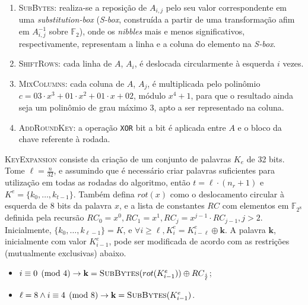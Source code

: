 \documentclass[12pt]{report}
\begin{document}
\begin{enumerate}[label=\roman*.]

    \item \textsc{SubBytes}: realiza-se a reposição de $A_{i,j}$
        pelo seu valor correspondente em uma \emph{substitution-box} (\emph{S-box}, construída a partir de uma transformação afim em $A_{i,j}^{-1}$ sobre $\mathbb{F}_2$), onde os \emph{nibbles} mais e menos significativos, respectivamente, representam a linha e a coluna do elemento na \emph{S-box}.

    \item \textsc{ShiftRows}: cada linha de $A$, $A_i$,
        é deslocada circularmente à esquerda $i$ vezes.

    \item \textsc{MixColumns}: cada coluna de $A$, $A_j$, é multiplicada pelo polinômio
        $c = 03 \cdot x^{3} + 01 \cdot x^{2} + 01 \cdot x + 02$, módulo $x^{4} + 1$, para que o resultado ainda seja um polinômio de grau máximo 3, apto a ser representado na coluna.

    \item \textsc{AddRoundKey}: a operação \texttt{XOR} bit a bit é aplicada entre $A$ e o
        bloco da chave referente à rodada.

\end{enumerate}

\textsc{KeyExpansion} consiste da criação de um conjunto de palavras $K_e$ de 32 bits.
Tome $\ell = \frac{n}{32}$, e assumindo que é necessário criar palavras suficientes para utilização em todas as rodadas do algoritmo, então $t = \ell \cdot (n_r + 1)$ e $K^e = \{k_0, \dots, k_{t - 1}\}$. Também defina $rot(x)$ como o deslocamento circular à esquerda de 8 bits da palavra $x$, e a lista de constantes $RC$ com elementos em $\mathbb{F}_{2^{8}}$ definida pela recursão $RC_0 = x^0, RC_1 = x^1, RC_j = x^{j-1} \cdot RC_{j-1}, j > 2$. Inicialmente, $\{k_0, \dots, k_{\ell - 1}\} = K$, e $\forall i \geq \ell, K^{e}_{i} = K^{e}_{i - \ell} \oplus \mathbf{k}$. A palavra $\mathbf{k}$, inicialmente com valor $K^{e}_{i - 1}$, pode ser modificada de acordo com as restrições (mutualmente exclusivas) abaixo.

\begin{itemize}
    \item $i \equiv 0 \pmod{4} \rightarrow \mathbf{k}
        = \textsc{SubBytes}(rot(K^{e}_{i - 1})) \oplus RC_{\frac{i}{\ell}}$;
    \item $\ell = 8 \land i \equiv 4 \pmod{8} \rightarrow \mathbf{k}
        = \textsc{SubBytes}(K^{e}_{i - 1})$.
\end{itemize}
\end{document}
